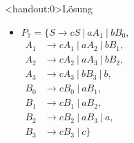 {
\begin{frame}<handout:0>{Lösung}
        \begin{itemize}
            \item 
                \alert<1>{
                $P_7 = \{S \to cS \ |\ aA_1 \ |\ bB_0,$\\
                \vspace*{0.9mm}
                \hspace*{7mm}
                $\begin{aligned}
                A_1 &\to cA_1 \ |\ aA_2 \ |\ bB_1,\\
                A_2 &\to cA_2 \ |\ aA_3 \ |\ bB_2,\\
                A_3 &\to cA_3 \ |\ bB_3 \ |\ b,\\
                B_0 &\to cB_0 \ |\ aB_1,\\
                B_1 &\to cB_1 \ |\ aB_2,\\
                B_2 &\to cB_2 \ |\ aB_3 \ |\ a,\\
                B_3 &\to cB_3 \ |\ c\}
                \end{aligned}
                $}
        \end{itemize}
\end{frame}
}
